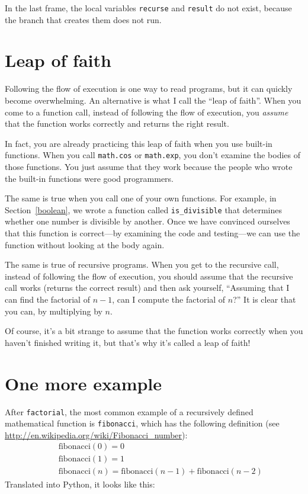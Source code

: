 \documentclass[10pt]{book}
\begin{document}
In the last frame, the local
variables {\tt recurse} and {\tt result} do not exist, because
the branch that creates them does not run.


\section{Leap of faith}

Following the flow of execution is one way to read programs, but
it can quickly become overwhelming.  An
alternative is what I call the ``leap of faith''.  When you come to a
function call, instead of following the flow of execution, you {\em
assume} that the function works correctly and returns the right
result.

In fact, you are already practicing this leap of faith when you use
built-in functions.  When you call {\tt math.cos} or {\tt math.exp},
you don't examine the bodies of those functions.  You just
assume that they work because the people who wrote the built-in
functions were good programmers.

The same is true when you call one of your own functions.  For
example, in Section~\ref{boolean}, we wrote a function called
\verb"is_divisible" that determines whether one number is divisible by
another.  Once we have convinced ourselves that this function is
correct---by examining the code and testing---we can use the function
without looking at the body again.

The same is true of recursive programs.  When you get to the recursive
call, instead of following the flow of execution, you should assume
that the recursive call works (returns the correct result) and then ask
yourself, ``Assuming that I can find the factorial of $n-1$, can I
compute the factorial of $n$?''  It is clear that you
can, by multiplying by $n$.

Of course, it's a bit strange to assume that the function works
correctly when you haven't finished writing it, but that's why
it's called a leap of faith!


\section{One more example}
\label{one.more.example}

After {\tt factorial}, the most common example of a recursively
defined mathematical function is {\tt fibonacci}, which has the
following definition (see
  \url{http://en.wikipedia.org/wiki/Fibonacci_number}):
%
\begin{eqnarray*}
&& \mathrm{fibonacci}(0) = 0 \\
&& \mathrm{fibonacci}(1) = 1 \\
&& \mathrm{fibonacci}(n) = \mathrm{fibonacci}(n-1) + \mathrm{fibonacci}(n-2)
\end{eqnarray*}
%
Translated into Python, it looks like this:
\end{document}
